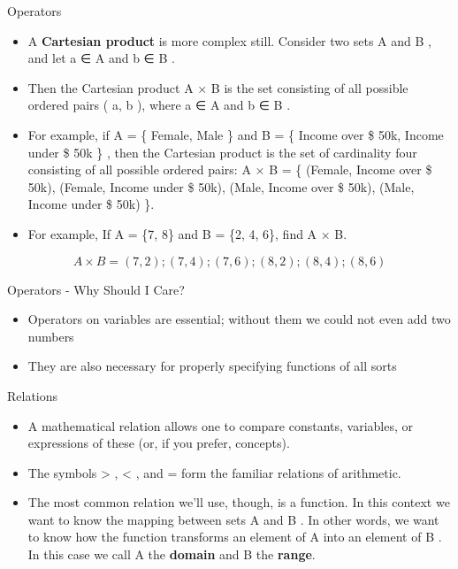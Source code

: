 \documentclass[
  ignorenonframetext,
]{beamer}
\begin{document}
\begin{frame}{Operators}
\protect\hypertarget{operators-9}{}

\begin{itemize}
\item
  A \textbf{Cartesian product} is more complex still. Consider two sets
  A and B , and let a ∈ A and b ∈ B .
\item
  Then the Cartesian product A × B is the set consisting of all possible
  ordered pairs ( a, b ), where a ∈ A and b ∈ B .
\item
  For example, if A = \{ Female, Male \} and B = \{ Income over \$ 50k,
  Income under \$ 50k \} , then the Cartesian product is the set of
  cardinality four consisting of all possible ordered pairs: A × B = \{
  (Female, Income over \$ 50k), (Female, Income under \$ 50k), (Male,
  Income over \$ 50k), (Male, Income under \$ 50k) \}.
\item
  For example, If A = \{7, 8\} and B = \{2, 4, 6\}, find A × B.
\end{itemize}

\[A × B = {(7, 2); (7, 4); (7, 6); (8, 2); (8, 4); (8, 6)}\]

\end{frame}

\begin{frame}{Operators - Why Should I Care?}
\protect\hypertarget{operators---why-should-i-care}{}

\begin{itemize}
\item
  Operators on variables are essential; without them we could not even
  add two numbers
\item
  They are also necessary for properly specifying functions of all sorts
\end{itemize}

\end{frame}

\begin{frame}{Relations}
\protect\hypertarget{relations}{}

\begin{itemize}
\item
  A mathematical relation allows one to compare constants, variables, or
  expressions of these (or, if you prefer, concepts).
\item
  The symbols \textgreater{} , \textless{} , and = form the familiar
  relations of arithmetic.
\item
  The most common relation we'll use, though, is a function. In this
  context we want to know the mapping between sets A and B . In other
  words, we want to know how the function transforms an element of A
  into an element of B . In this case we call A the \textbf{domain} and
  B the \textbf{range}.
\end{itemize}

\end{frame}
\end{document}
